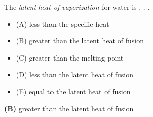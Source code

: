 

The {\it latent heat of vaporization} for water is . . .

\begin{itemize}
\item{(A)} less than the specific heat
\vskip 5pt 
\item{(B)} greater than the latent heat of fusion
\vskip 5pt 
\item{(C)} greater than the melting point
\vskip 5pt 
\item{(D)} less than the latent heat of fusion
\vskip 5pt 
\item{(E)} equal to the latent heat of fusion
\end{itemize}







{\bf (B)} greater than the latent heat of fusion
 










